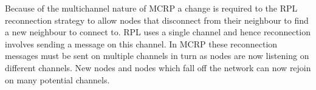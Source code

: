 Because of the multichannel nature of MCRP a change is required to the RPL reconnection strategy to allow nodes that disconnect from their neighbour to find a new neighbour to connect to.  RPL uses a single channel and hence reconnection involves sending a message on this channel.  In MCRP these reconnection messages must be sent on multiple channels in turn as nodes are now listening on different channels.  New nodes and nodes which fall off the network can now rejoin on many potential channels.
